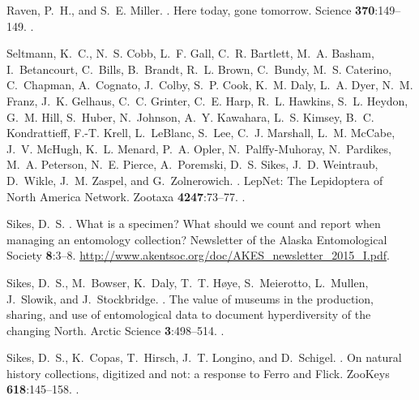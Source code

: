 \begin{multicols}{2}
\begin{thebibliography}{11}
Raven, P.~H., and S.~E. Miller.
.
\newblock Here today, gone tomorrow.
\newblock Science {\bfseries 370}:149--149.
\newblock {}.

Seltmann, K.~C., N.~S. Cobb, L.~F. Gall, C.~R. Bartlett, M.~A. Basham,
  I.~Betancourt, C.~Bills, B.~Brandt, R.~L. Brown, C.~Bundy, M.~S. Caterino,
  C.~Chapman, A.~Cognato, J.~Colby, S.~P. Cook, K.~M. Daly, L.~A. Dyer, N.~M.
  Franz, J.~K. Gelhaus, C.~C. Grinter, C.~E. Harp, R.~L. Hawkins, S.~L. Heydon,
  G.~M. Hill, S.~Huber, N.~Johnson, A.~Y. Kawahara, L.~S. Kimsey, B.~C.
  Kondrattieff, F.-T. Krell, L.~LeBlanc, S.~Lee, C.~J. Marshall, L.~M. McCabe,
  J.~V. McHugh, K.~L. Menard, P.~A. Opler, N.~Palffy-Muhoray, N.~Pardikes,
  M.~A. Peterson, N.~E. Pierce, A.~Poremski, D.~S. Sikes, J.~D. Weintraub,
  D.~Wikle, J.~M. Zaspel, and G.~Zolnerowich.
.
\newblock LepNet: The Lepidoptera of North America Network.
\newblock Zootaxa {\bfseries 4247}:73--77.
\newblock {}.

Sikes, D.~S.
.
\newblock What is a specimen? What should we count and report when managing an
  entomology collection?
\newblock Newsletter of the Alaska Entomological Society {\bfseries 8}:3--8.
\newblock
  \urlprefix\url{http://www.akentsoc.org/doc/AKES_newsletter_2015_I.pdf}.

Sikes, D.~S., M.~Bowser, K.~Daly, T.~T. Høye, S.~Meierotto, L.~Mullen,
  J.~Slowik, and J.~Stockbridge.
.
\newblock The value of museums in the production, sharing, and use of
  entomological data to document hyperdiversity of the changing North.
\newblock Arctic Science {\bfseries 3}:498--514.
\newblock {}.

Sikes, D.~S., K.~Copas, T.~Hirsch, J.~T. Longino, and D.~Schigel.
.
\newblock On natural history collections, digitized and not: a response to
  Ferro and Flick.
\newblock ZooKeys {\bfseries 618}:145--158.
\newblock {}.


\end{thebibliography}
\end{multicols}
